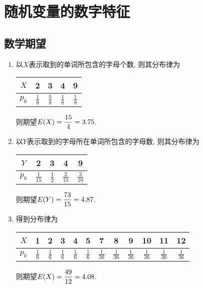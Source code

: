\section{随机变量的数字特征}
\subsection{数学期望}
\begin{prob}
	\begin{enumerate}
	\item
	以$X$表示取到的单词所包含的字母个数, 则其分布律为
	\begin{center}
		\begin{tabular}{c|cccc}
			\hline
			$X$&2&3&4&9\\
			\hline
			$p_k$&$\frac{1}{8}$&$\frac{5}{8}$&$\frac{1}{8}$&$\frac{1}{8}$\\
			\hline
		\end{tabular}
	\end{center}
	则期望$\displaystyle E(X)=\frac{15}{4}=3.75$.
	\item
	以$Y$表示取到的字母所在单词所包含的字母数, 则其分布律为
	\begin{center}
		\begin{tabular}{c|cccc}
			\hline
			$Y$&2&3&4&9\\
			\hline
			$p_k$&$\frac{1}{15}$&$\frac{1}{2}$&$\frac{2}{15}$&$\frac{3}{10}$\\
			\hline
		\end{tabular}
	\end{center}
	则期望$\displaystyle E(Y)=\frac{73}{15}=4.87$.
	\item
	得到分布律为
	\begin{center}
		\begin{tabular}{c|ccccccccccc}
			\hline
			$X$&1&2&3&4&5&7&8&9&10&11&12\\
			\hline
			$p_k$&$\frac{1}{6}$&$\frac{1}{6}$&$\frac{1}{6}$&$\frac{1}{6}$&$\frac{1}{6}$
			&$\frac{1}{36}$&$\frac{1}{36}$&$\frac{1}{36}$&$\frac{1}{36}$&$\frac{1}{36}$&$\frac{1}{36}$\\
			\hline
		\end{tabular}
	\end{center}
	则期望$\displaystyle E(X)=\frac{49}{12}=4.08$.
	\end{enumerate}
\end{prob}
\setcounter{prob}{5}
